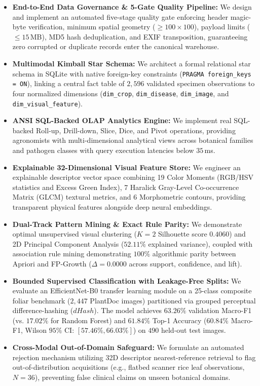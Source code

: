\documentclass[conference]{IEEEtran}
\begin{document}
\begin{itemize}
    \item \textbf{End-to-End Data Governance \& 5-Gate Quality Pipeline:} We design and implement an automated five-stage quality gate enforcing header magic-byte verification, minimum spatial geometry ($\ge 100\times 100$), payload limits ($\le 15$\,MB), MD5 hash deduplication, and EXIF transposition, guaranteeing zero corrupted or duplicate records enter the canonical warehouse.
    \item \textbf{Multimodal Kimball Star Schema:} We architect a formal relational star schema in SQLite with native foreign-key constraints (\texttt{PRAGMA foreign\_keys = ON}), linking a central fact table of $2,596$ validated specimen observations to four normalized dimensions (\texttt{dim\_crop}, \texttt{dim\_disease}, \texttt{dim\_image}, and \texttt{dim\_visual\_feature}).
    \item \textbf{ANSI SQL-Backed OLAP Analytics Engine:} We implement real SQL-backed Roll-up, Drill-down, Slice, Dice, and Pivot operations, providing agronomists with multi-dimensional analytical views across botanical families and pathogen classes with query execution latencies below $35$\,ms.
    \item \textbf{Explainable 32-Dimensional Visual Feature Store:} We engineer an explainable descriptor vector space combining 19 Color Moments (RGB/HSV statistics and Excess Green Index), 7 Haralick Gray-Level Co-occurrence Matrix (GLCM) textural metrics, and 6 Morphometric contours, providing transparent physical features alongside deep neural embeddings.
    \item \textbf{Dual-Track Pattern Mining \& Exact Rule Parity:} We demonstrate optimal unsupervised visual clustering ($K=2$ Silhouette score $0.4060$) and 2D Principal Component Analysis ($52.11\%$ explained variance), coupled with association rule mining demonstrating $100\%$ algorithmic parity between Apriori and FP-Growth ($\Delta = 0.0000$ across support, confidence, and lift).
    \item \textbf{Bounded Supervised Classification with Leakage-Free Splits:} We evaluate an EfficientNet-B0 transfer learning module on a 25-class composite foliar benchmark ($2,447$ PlantDoc images) partitioned via grouped perceptual difference-hashing ($dHash$). The model achieves $63.26\%$ validation Macro-F1 (vs. $17.02\%$ for Random Forest) and $61.84\%$ Top-1 Accuracy ($60.84\%$ Macro-F1, Wilson $95\%$ CI: $[57.46\%, 66.03\%]$) on $490$ held-out test images.
    \item \textbf{Cross-Modal Out-of-Domain Safeguard:} We formulate an automated rejection mechanism utilizing 32D descriptor nearest-reference retrieval to flag out-of-distribution acquisitions (e.g., flatbed scanner rice leaf observations, $N=36$), preventing false clinical claims on unseen botanical domains.
\end{itemize}
\end{document}
